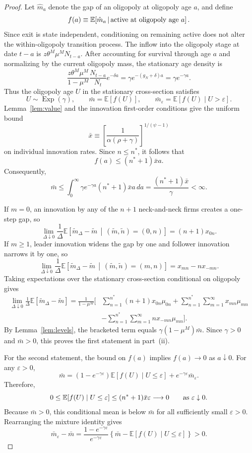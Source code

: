 \documentclass[12pt]{article}
\begin{document}
\begin{proof}
Let \(\hat m_a\) denote the gap of an oligopoly at oligopoly age \(a\), and
define
\[
f(a)
\equiv
\mathbb E\!\left[
\hat m_a
\,\middle|\,
\textnormal{active at oligopoly age }a
\right].
\]
Since exit is state independent, conditioning on remaining active does not
alter the within-oligopoly transition process.
The inflow into the oligopoly stage at date \(t-a\) is
\(z\theta^M\mu^M N_{t-a}\). After accounting for survival through age \(a\)
and normalizing by the current oligopoly mass, the stationary age density is
\[
\frac{z\theta^M\mu^M}{1-\mu^M}
\frac{N_{t-a}}{N_t}e^{-\delta a}
=
\gamma e^{-(g_N+\delta)a}
=
\gamma e^{-\gamma a}.
\]
Thus the oligopoly age \(U\) in the stationary cross-section satisfies
\[
U\sim\operatorname{Exp}(\gamma),
\qquad
\bar m=\mathbb E[f(U)],
\qquad
\bar m_\varepsilon=\mathbb E[f(U)\mid U>\varepsilon].
\]
Lemma~\ref{lem:value} and the innovation first-order conditions give the
uniform bound
\[
\bar x
\equiv
\left[
\frac{1}{\alpha(\rho+\gamma)}
\right]^{1/(\psi-1)}
\]
on individual innovation rates. Since \(n\leq n^\ast\), it follows that
\[
f(a)\leq(n^\ast+1)\bar x a.
\]
Consequently,
\[
\bar m
\leq
\int_0^\infty
\gamma e^{-\gamma a}(n^\ast+1)\bar x a\,da
=
\frac{(n^\ast+1)\bar x}{\gamma}
<
\infty.
\]

If \(m=0\), an innovation by any of the \(n+1\) neck-and-neck firms creates a
one-step gap, so
\[
\lim_{\Delta\downarrow0}\frac{1}{\Delta}
\mathbb E\!\left[
\tilde m_\Delta-\tilde m
\,\middle|\,
(\tilde m,\tilde n)=(0,n)
\right]
=(n+1)x_{0n}.
\]
If \(m\geq1\), leader innovation widens the gap by one and follower innovation
narrows it by one, so
\[
\lim_{\Delta\downarrow0}\frac{1}{\Delta}
\mathbb E\!\left[
\tilde m_\Delta-\tilde m
\,\middle|\,
(\tilde m,\tilde n)=(m,n)
\right]
=x_{mn}-nx_{-mn}.
\]
Taking expectations over the stationary cross-section conditional on
oligopoly gives
\[
\begin{aligned}
\lim_{\Delta\downarrow0}\frac{1}{\Delta}
\mathbb E[\tilde m_\Delta-\tilde m]
=\frac{1}{1-\mu^M}\Bigg[
&\sum_{n=1}^{n^\ast}(n+1)x_{0n}\mu_{0n}
+\sum_{n=1}^{n^\ast}\sum_{m=1}^{\infty}x_{mn}\mu_{mn}\\
&-\sum_{n=1}^{n^\ast}\sum_{m=1}^{\infty}nx_{-mn}\mu_{mn}
\Bigg].
\end{aligned}
\]
By Lemma~\ref{lem:levels}, the bracketed term equals
\(\gamma(1-\mu^M)\bar m\). Since \(\gamma>0\) and \(\bar m>0\),
this proves the first statement in part~(ii).

For the second statement, the bound on \(f(a)\) implies \(f(a)\to0\) as
\(a\downarrow0\). For any \(\varepsilon>0\),
\[
\bar m
=(1-e^{-\gamma\varepsilon})
\mathbb E[f(U)\mid U\leq\varepsilon]
+e^{-\gamma\varepsilon}\bar m_\varepsilon.
\]
Therefore,
\[
0
\leq
\mathbb E[f(U)\mid U\leq\varepsilon]
\leq
(n^\ast+1)\bar x\varepsilon
\longrightarrow
0
\qquad\textnormal{as }\varepsilon\downarrow0.
\]
Because \(\bar m>0\), this conditional mean is below \(\bar m\) for all
sufficiently small \(\varepsilon>0\). Rearranging the mixture identity gives
\[
\bar m_\varepsilon-\bar m
=
\frac{1-e^{-\gamma\varepsilon}}{e^{-\gamma\varepsilon}}
\left\{
\bar m-\mathbb E[f(U)\mid U\leq\varepsilon]
\right\}
>
0.
\]


\end{proof}
\end{document}
